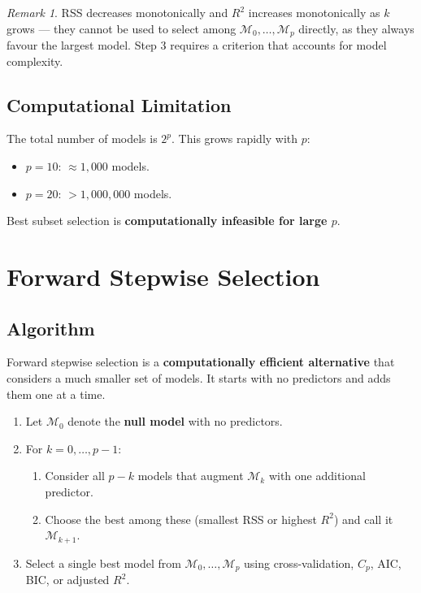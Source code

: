 \documentclass[11pt,a4paper]{article}
\theoremstyle{definition}
\theoremstyle{plain}
\theoremstyle{remark}
\newtheorem*{remark}{Remark}
\begin{document}
\begin{remark}
RSS decreases monotonically and $R^2$ increases monotonically as $k$ grows — they cannot be used to select among $\mathcal{M}_0, \ldots, \mathcal{M}_p$ directly, as they always favour the largest model. Step 3 requires a criterion that accounts for model complexity.
\end{remark}

\subsection{Computational Limitation}

The total number of models is $2^p$. This grows rapidly with $p$:
\begin{itemize}
    \item $p = 10$: $\approx 1{,}000$ models.
    \item $p = 20$: $> 1{,}000{,}000$ models.
\end{itemize}
Best subset selection is \textbf{computationally infeasible for large $p$}.


\section{Forward Stepwise Selection}

\subsection{Algorithm}

Forward stepwise selection is a \textbf{computationally efficient alternative} that considers a much smaller set of models. It starts with no predictors and adds them one at a time.

\begin{enumerate}
    \item Let $\mathcal{M}_0$ denote the \textbf{null model} with no predictors.
    \item For $k = 0, \ldots, p-1$:
        \begin{enumerate}[label=(\alph*)]
            \item Consider all $p - k$ models that augment $\mathcal{M}_k$ with one additional predictor.
            \item Choose the best among these (smallest RSS or highest $R^2$) and call it $\mathcal{M}_{k+1}$.
        \end{enumerate}
    \item Select a single best model from $\mathcal{M}_0, \ldots, \mathcal{M}_p$ using cross-validation, $C_p$, AIC, BIC, or adjusted $R^2$.
\end{enumerate}
\end{document}

